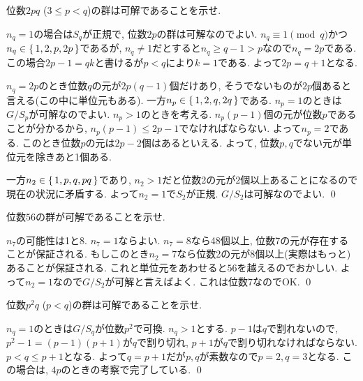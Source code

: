 \begin{egprob}
位数$2pq$ ($3\leq p<q$)の群は可解であることを示せ.
\end{egprob}
\begin{egans}
$n_q = 1$の場合は$S_q$が正規で, 位数$2p$の群は可解なのでよい. $n_q\equiv 1\pmod{q}$かつ$n_q \in \set{1,2,p,2p}$であるが, $n_q \neq 1$だとすると$n_q \geq q-1 >  p$なので$n_q = 2p$である. この場合$2p-1 = qk$と書けるが$p<q$により$k=1$である. よって$2p=q+1$となる. \par
$n_q = 2p$のとき位数$q$の元が$2p(q-1)$個だけあり, そうでないものが$2p$個あると言える(この中に単位元もある).
一方$n_p \in \set{1,2,q,2q}$である. $n_p = 1$のときは$G/S_p$が可解なのでよい. $n_p > 1$のときを考える. $n_p(p-1)$個の元が位数$p$であることが分かるから, $n_p(p-1) \leq 2p-1$でなければならない. よって$n_p = 2$である. このとき位数$p$の元は$2p-2$個はあるといえる. よって, 位数$p,q$でない元が単位元を除きあと1個ある. \par
一方$n_2 \in \set{1,p,q,pq}$であり, $n_2 > 1$だと位数2の元が$2$個以上あることになるので現在の状況に矛盾する. よって$n_2=1$で$S_2$が正規. $G/S_2$は可解なのでよい. \qed
\end{egans}
\begin{egprob}
位数$56$の群が可解であることを示せ.
\end{egprob}
\begin{egans}
$n_7$の可能性は1と8. $n_7 = 1$ならよい. $n_7 = 8$なら48個以上, 位数7の元が存在することが保証される. もしこのとき$n_2 = 7$なら位数2の元が$8$個以上(実際はもっと)あることが保証される. これと単位元をあわせると$56$を越えるのでおかしい. よって$n_2 = 1$なので$G/S_2$が可解と言えばよく. これは位数7なのでOK. \qed
\end{egans}




\begin{egprob}
位数$p^2q$ ($p<q$)の群は可解であることを示せ.
\end{egprob}
\begin{egans}
$n_q=1$のときは$G/S_q$が位数$p^2$で可換. $n_q>1$とする. $p-1$は$q$で割れないので, $p^2-1 = (p-1)(p+1)$が$q$で割り切れ, $p+1$が$q$で割り切れなければならない. $p < q \leq p+1$となる. よって$q=p+1$だが$p,q$が素数なので$p=2,q=3$となる. この場合は, $4p$のときの考察で完了している. \qed
\end{egans}

